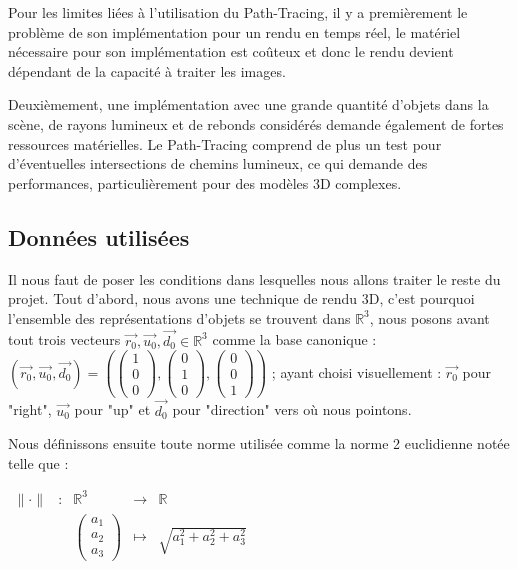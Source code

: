 Pour les limites liées à l'utilisation du Path-Tracing, il y a premièrement le problème de son implémentation pour un rendu en temps réel, le matériel nécessaire pour son implémentation est coûteux et donc le rendu devient dépendant de la capacité à traiter les images.

Deuxièmement, une implémentation avec une grande quantité d'objets dans la scène, de rayons lumineux et de rebonds considérés demande également de fortes ressources matérielles. Le Path-Tracing comprend de plus un test pour d'éventuelles intersections de chemins lumineux, ce qui demande des performances, particulièrement pour des modèles 3D complexes.

\subsection{Données utilisées}

Il nous faut de poser les conditions dans lesquelles nous allons traiter le reste du projet. Tout d'abord, nous avons une technique de rendu 3D, c'est pourquoi l'ensemble des représentations d'objets se trouvent dans $\mathbb{R}^3$, nous posons avant tout trois vecteurs $\vec{r_0}, \vec{u_0}, \vec{d_0} \in \mathbb{R}^3$ comme la base canonique : $(\vec{r_0}, \vec{u_0}, \vec{d_0}) =
\left(
\left( \begin{smallmatrix} 1 \\ 0 \\ 0 \end{smallmatrix} \right),
\left( \begin{smallmatrix} 0 \\ 1 \\ 0 \end{smallmatrix} \right),
\left( \begin{smallmatrix} 0 \\ 0 \\ 1 \end{smallmatrix} \right)
\right)$ ; ayant choisi visuellement : $\vec{r_0}$ pour "right", $\vec{u_0}$ pour "up" et $\vec{d_0}$ pour "direction" vers où nous pointons.

Nous définissons ensuite toute norme utilisée comme la norme 2 euclidienne notée telle que :

$\begin{array}{ccccc}
\lVert \cdot \rVert & : & \mathbb{R}^3 & \to & \mathbb{R} \\
 & & \begin{pmatrix} a_1 \\ a_2 \\ a_3 \end{pmatrix} & \mapsto & \sqrt{a_1^2+a_2^2+a_3^2} \end{array}$ \\ \\


